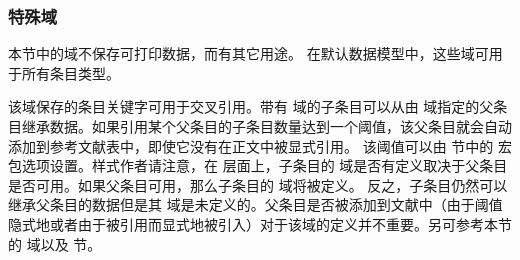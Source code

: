\subsubsection{特殊域}
\label{bib:fld:spc}


本节中的域不保存可打印数据，而有其它用途。
在默认数据模型中，这些域可用于所有条目类型。

\begin{fieldlist}



该域保存的条目关键字可用于交叉引用。带有  域的子条目可以从由  域指定的父条目继承数据。如果引用某个父条目的子条目数量达到一个阈值，该父条目就会自动添加到参考文献表中，即使它没有在正文中被显式引用。
该阈值可以由  节中的  宏包选项设置。样式作者请注意，在 \biblatex 层面上，子条目的  域是否有定义取决于父条目是否可用。如果父条目可用，那么子条目的  域将被定义。
反之，子条目仍然可以继承父条目的数据但是其  域是未定义的。父条目是否被添加到文献中（由于阈值隐式地或者由于被引用而显式地被引入）对于该域的定义并不重要。另可参考本节的  域以及  节。


\end{fieldlist}
